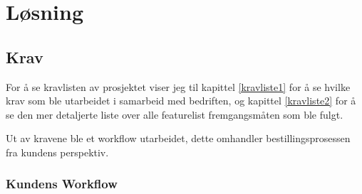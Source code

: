 \chapter{Løsning}

\section{Krav}
For å se kravlisten av prosjektet viser jeg til kapittel \ref{kravliste1} for å se hvilke krav som ble utarbeidet i samarbeid med bedriften, og kapittel \ref{kravliste2} for å se den mer detaljerte liste over alle  featurelist fremgangsmåten som ble fulgt.

Ut av kravene ble et workflow utarbeidet, dette omhandler bestillingsprosessen fra kundens perspektiv.

\subsection{Kundens Workflow}
